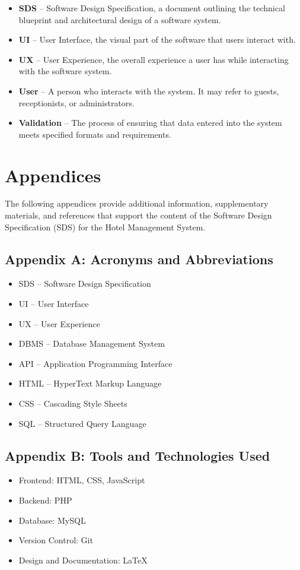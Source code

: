 \documentclass[a4paper,12pt]{article}
\begin{document}
\begin{itemize}
    \item \textbf{SDS} – Software Design Specification, a document outlining the technical blueprint and architectural design of a software system.
    
    \item \textbf{UI} – User Interface, the visual part of the software that users interact with.
    
    \item \textbf{UX} – User Experience, the overall experience a user has while interacting with the software system.
    
    \item \textbf{User} – A person who interacts with the system. It may refer to guests, receptionists, or administrators.
    
    \item \textbf{Validation} – The process of ensuring that data entered into the system meets specified formats and requirements.
\end{itemize}

\section{Appendices}

The following appendices provide additional information, supplementary materials, and references that support the content of the Software Design Specification (SDS) for the Hotel Management System.

\subsection{Appendix A: Acronyms and Abbreviations}
\begin{itemize}
    \item SDS – Software Design Specification  
    \item UI – User Interface  
    \item UX – User Experience  
    \item DBMS – Database Management System  
    \item API – Application Programming Interface  
    \item HTML – HyperText Markup Language  
    \item CSS – Cascading Style Sheets  
    \item SQL – Structured Query Language
\end{itemize}

\subsection{Appendix B: Tools and Technologies Used}
\begin{itemize}
    \item Frontend: HTML, CSS, JavaScript  
    \item Backend: PHP  
    \item Database: MySQL  
    \item Version Control: Git  
    \item Design and Documentation: LaTeX  
\end{itemize}
\end{document}
